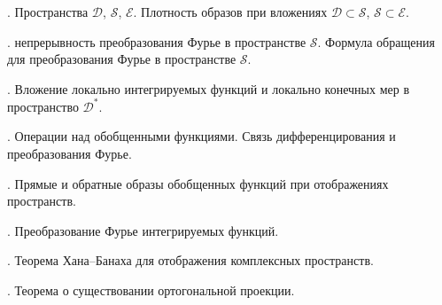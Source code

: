 \documentclass[12pt,titlepage, a4paper]{article}
\begin{document}
. Пространства $\mathcal{D}$, $\mathcal{S}$,
$\mathcal{E}$. Плотность образов при вложениях $\mathcal{D}\subset
\mathcal{S}$, $\mathcal{S}\subset\mathcal{E}$.

. непрерывность преобразования Фурье в пространстве
$\mathcal{S}$. Формула обращения для преобразования Фурье в
пространстве $\mathcal{S}$.

. Вложение локально интегрируемых функций и локально
конечных мер в пространство $\mathcal{D}^*$.

. Операции над обобщенными функциями. Связь
дифференцирования и преобразования Фурье.

. Прямые и обратные образы обобщенных функций при
отображениях пространств.

. Преобразование Фурье интегрируемых функций.

. Теорема Хана--Банаха для отображения комплексных
пространств.

. Теорема о существовании ортогональной проекции.
\end{document}
